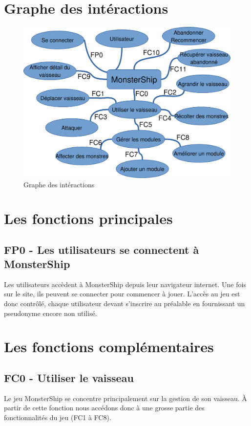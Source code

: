 \documentclass[a4paper,11pt]{report}
\begin{document}
    \section{Graphe des intéractions}
        \begin{figure}[h]
            \begin{center}
                \includegraphics[width=\textwidth]{graphe_interactions.png}
                \caption{Graphe des intéractions}
                \label{fig:graphe_interactions}
            \end{center}
        \end{figure}

    \section{Les fonctions principales}
        \subsection{FP0 - Les utilisateurs se connectent à MonsterShip}
            Les utilisateurs accèdent à MonsterShip depuis leur navigateur internet. Une fois sur le site, ils peuvent se connecter pour commencer à jouer. L'accès au jeu est donc contrôlé, chaque utilisateur devant s'inscrire au préalable en fournissant un pseudonyme encore non utilisé.
    
    \section{Les fonctions complémentaires}
        \subsection{FC0 - Utiliser le vaisseau}
            Le jeu MonsterShip se concentre principalement sur la gestion de son vaisseau. À partir de cette fonction nous accédons donc à une grosse partie des fonctionnalités du jeu (FC1 à FC8).
        
\end{document}
